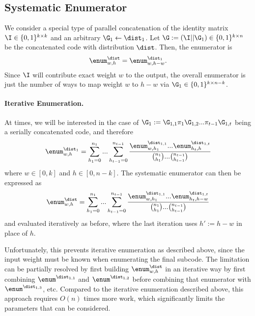 

\subsection{Systematic Enumerator}\label{ssec:senum}
We consider a special type of parallel concatenation of the identity matrix $\I\in \{0,1\}^{k\times k}$ and an arbitrary $\G_1\gets\dist_1$. Let $\G:=(\I||\G_1)\in \{0,1\}^{k\times n}$ be the concatenated code with distribution $\dist$. Then, the enumerator is
$$
\enum^\dist_{w,h}=\enum_{w,h-w}^{\dist_1}.
$$
Since $\I$ will contribute exact weight $w$ to the output, the overall enumerator is just the number of ways to map weight $w$ to $h-w$ via $\G_1\in \{0,1\}^{k\times n-k}$. 


\paragraph{Iterative Enumeration.} At times, we will be interested in the case of $\G_1:=\G_{1,1}\pi_1\G_{1,2}...\pi_{t-1}\G_{1,t}$ being a serially concatenated code, and therefore
$$      
    \enum^{\dist_1}_{w,h}=\sum_{h_1=0}^{n_1}...\sum_{h_{t-1}=0}^{n_{t-1}}\frac{\enum^{\dist_{1,1}}_{w,h_1} ... \enum^{\dist_{1,t}}_{h_t,h} }{{n_1\choose h_1}...{n_{t-1}\choose h_{t-1}}}
$$
where $w\in [0,k]$ and $h\in [0,n-k]$. The systematic enumerator can then be expressed as
$$      
    \enum^{\dist}_{w,h}=\sum_{h_1=0}^{n_1}...\sum_{h_{t-1}=0}^{n_{t-1}}\frac{\enum^{\dist_{1,1}}_{w,h_1} ... \enum^{\dist_{1,t}}_{h_t,h-w} }{{n_1\choose h_1}...{n_{t-1}\choose h_{t-1}}}
$$
and evaluated iteratively as before, where the last iteration uses $h':=h-w$ in place of $h$. 

Unfortunately, this prevents iterative enumeration as described above, since the input weight must be known when enumerating the final subcode.
The limitation can be partially resolved by first building $\enum^{\dist}_{w,h}$ in an iterative way by first combining $\enum^{\dist_{1,1}}$ and $\enum^{\dist_{1,2}}$ before combining that enumerator with $\enum^{\dist_{1,3}}$, etc. Compared to the iterative enumeration described above, this approach requires $O(n)$ times more work, which significantly limits the parameters that can be considered. 

